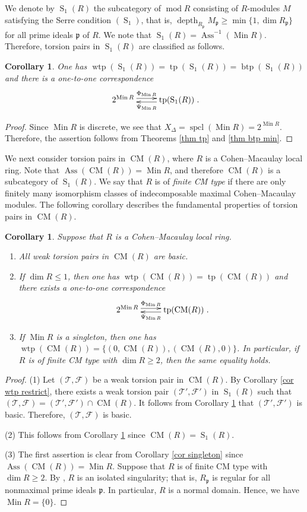 \documentclass{amsart}
\newtheorem{cor}[thm]{Corollary}
\theoremstyle{definition}
\theoremstyle{remark}
\def\Ass{\operatorname{Ass}}
\def\btp{\operatorname{btp}}
\def\CM{\operatorname{CM}}
\def\depth{\operatorname{depth}}
\def\dim{\operatorname{dim}}
\def\F{\mathcal{F}}
\def\Min{\operatorname{Min}}
\def\mod{\operatorname{mod}}
\def\p{\mathfrak{p}}
\def\S{\operatorname{S}}
\def\spcl{\operatorname{spcl}}
\def\T{\mathcal{T}}
\def\tp{\operatorname{tp}}
\def\wtp{\operatorname{wtp}}
\begin{document}
We denote by $\S_1(R)$ the subcategory of $\mod R$ consisting of $R$-modules $M$ satisfying the Serre condition $(\S_1)$, that is, $\depth_{R_\p}M_\p\ge\min\{1,\dim R_\p\}$ for all prime ideals $\p$ of $R$. We note that $\S_1(R)=\Ass^{-1}(\Min R)$. Therefore, torsion pairs in $\S_1(R)$ are classified as follows.

\begin{cor}\label{cor S1}
One has $\wtp(\S_1(R))=\tp(\S_1(R))=\btp(\S_1(R))$ and there is a one-to-one correspondence
\[\xymatrix{2^{\Min R}\ar@<0.5ex>[r]^-{\Phi_{\Min R}}&\tp(\S_1(R))\ar@<0.5ex>[l]^-{\Psi_{\Min R}}}.\]
\end{cor}

\begin{proof}
Since $\Min R$ is discrete, we see that $X_\Delta=\spcl(\Min R)=2^{\Min R}$. Therefore, the assertion follows from Theorems \ref{thm tp} and \ref{thm btp min}.
\end{proof}

We next consider torsion pairs in $\CM(R)$, where $R$ is a Cohen--Macaulay local ring. Note that $\Ass(\CM(R))=\Min R$, and therefore $\CM(R)$ is a subcategory of $\S_1(R)$. We say that $R$ is of {\em finite CM type} if there are only finitely many isomorphism classes of indecomposable maximal Cohen--Macaulay modules. The following corollary describes the fundamental properties of torsion pairs in $\CM(R)$.

\begin{cor}\label{cor CM}
Suppose that $R$ is a Cohen--Macaulay local ring.
\begin{enumerate}[\rm(1)]
\item
All weak torsion pairs in $\CM(R)$ are basic.
\item 
If $\dim R\le 1$, then one has $\wtp(\CM(R))=\tp(\CM(R))$ and there exists a one-to-one correspondence
$$\xymatrix{2^{\Min R}\ar@<0.5ex>[r]^-{\Phi_{\Min R}}&\tp(\CM(R))\ar@<0.5ex>[l]^-{\Psi_{\Min R}}}.$$
\item 
If $\Min R$ is a singleton, then one has $\wtp(\CM(R))=\{(0,\CM(R)),(\CM(R),0)\}$. In particular, if $R$ is of finite CM type with $\dim R\ge 2$, then the same equality holds.
\end{enumerate}
\end{cor}

\begin{proof}
(1) Let $(\T,\F)$ be a weak torsion pair in $\CM(R)$. By Corollary \ref{cor wtp restrict}, there exists a weak torsion pair $(\T',\F')$ in $\S_1(R)$ such that $(\T,\F)=(\T',\F')\cap\CM(R)$. It follows from Corollary \ref{cor S1} that $(\T',\F')$ is basic. Therefore, $(\T,\F)$ is basic.

(2) This follows from Corollary \ref{cor S1} since $\CM(R)=\S_1(R)$.

(3) The first assertion is clear from Corollary \ref{cor singleton} since $\Ass(\CM(R))=\Min R$. Suppose that $R$ is of finite CM type with $\dim R\ge 2$. By \cite[Theorem 7.12]{LW}, $R$ is an isolated singularity; that is, $R_\p$ is regular for all nonmaximal prime ideals $\p$. In particular, $R$ is a normal domain. Hence, we have $\Min R=\{0\}$.
\end{proof}
\end{document}
